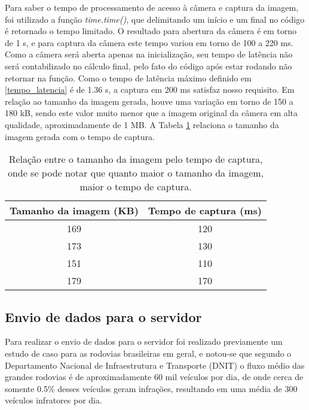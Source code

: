 Para saber o tempo de processamento de acesso à câmera e captura da imagem, foi utilizado a função \emph{time.time()}, que delimitando um início e um final no código é retornado o tempo limitado. O resultado para abertura da câmera é em torno de 1 s, e para captura da câmera este tempo variou em torno de 100 a 220 ms. Como a câmera será aberta apenas na inicialização, seu tempo de latência não será contabilizado no cálculo final, pelo fato do código após estar rodando não retornar na função. Como o tempo de latência máximo definido em \ref{tempo_latencia} é de 1.36 s, a captura em 200 ms satisfaz nosso requisito. Em relação ao tamanho da imagem gerada, houve uma variação em torno de 150 a 180 kB, sendo este valor muito menor que a imagem original da câmera em alta qualidade, aproximadamente de 1 MB.
A Tabela \ref{tabcap} relaciona o tamanho da imagem gerada com o tempo de captura.

\begin{table}[H]
\centering
\caption{\label{tabcap}Relação entre o tamanho da imagem pelo tempo de captura, onde se pode notar que quanto maior o tamanho da imagem, maior o tempo de captura.}

\begin{tabular}{|c|c|}
\hline
Tamanho da imagem (KB) & Tempo de captura (ms) \\ \hline
169                    & 120                   \\ \hline
173                    & 130                   \\ \hline
151                    & 110                   \\ \hline
179                    & 170                   \\ \hline

\end{tabular}
\end{table}

    \subsection{Envio de dados para o servidor}
    
Para realizar o envio de dados para o servidor foi realizado previamente um estudo de caso para as rodovias brasileiras em geral, e notou-se que segundo o Departamento Nacional de Infraestrutura e Transporte (DNIT) \cite{DNIT} o fluxo médio das grandes rodovias é de aproximadamente 60 mil veículos por dia, de onde cerca de somente 0.5\% desses veículos geram infrações, resultando em uma média de 300 veículos infratores por dia.

